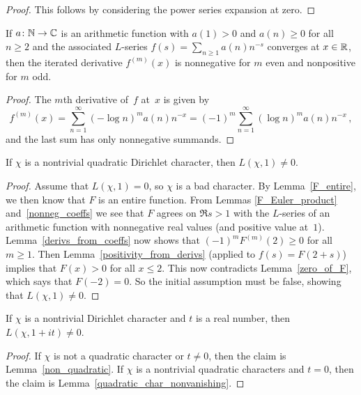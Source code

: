 \begin{proof}
  \leanok
  This follows by considering the power series expansion at zero.
\end{proof}

\begin{lemma} \label{derivs_from_coeffs}
  If $a \colon \mathbb{N} \to \mathbb{C}$ is an arithmetic function with $a(1) > 0$ and $a(n) \ge 0$ for all $n \ge 2$
  and the associated $L$-series $f(s) = \sum_{n \ge 1} a(n) n^{-s}$ converges at $x \in \mathbb{R}$, then
  the iterated derivative $f^{(m)}(x)$ is nonnegative for $m$ even and nonpositive for $m$ odd.
\end{lemma}

\begin{proof}
  The $m$th derivative of~$f$ at~$x$ is given by
  \[ f^{(m)}(x) = \sum_{n=1}^\infty (-\log n)^m a(n) n^{-x} = (-1)^m \sum_{n=1}^\infty (\log n)^m a(n) n^{-x} \,, \]
  and the last sum has only nonnegative summands.
\end{proof}

\begin{lemma} \label{quadratic_char_nonvanishing}
  \leanok
  If $\chi$ is a nontrivial quadratic Dirichlet character, then $L(\chi, 1) \ne 0$.
\end{lemma}

\begin{proof}
  Assume that $L(\chi, 1) = 0$, so $\chi$ is a bad character. By Lemma~\ref{F_entire}, we then know
  that $F$ is an entire function. From Lemmas \ref{F_Euler_product} and~\ref{nonneg_coeffs} we see
  that $F$ agrees on $\Re s > 1$ with the $L$-series of an arithmetic function with nonnegative
  real values (and positive value at~$1$). Lemma~\ref{derivs_from_coeffs} now shows that
  $(-1)^m F^{(m)}(2) \ge 0$ for all~$m \ge 1$. Then Lemma~\ref{positivity_from_derivs}
  (applied to $f(s) = F(2+s)$) implies that $F(x) > 0$ for all $x \le 2$. This now
  contradicts Lemma~\ref{zero_of_F}, which says that $F(-2) = 0$. So the initial assumption
  must be false, showing that $L(\chi, 1) \ne 0$.
\end{proof}

\begin{theorem} \label{dirichlet_char_nonvanishing}
  If $\chi$ is a nontrivial Dirichlet character and $t$ is a real number, then $L(\chi, 1 + it) \ne 0$.
\end{theorem}

\begin{proof}
  If $\chi$ is not a quadratic character or $t \ne 0$, then the claim is Lemma~\ref{non_quadratic}.
  If $\chi$ is a nontrivial quadratic characters and $t = 0$, then the claim is Lemma~\ref{quadratic_char_nonvanishing}.
\end{proof}
